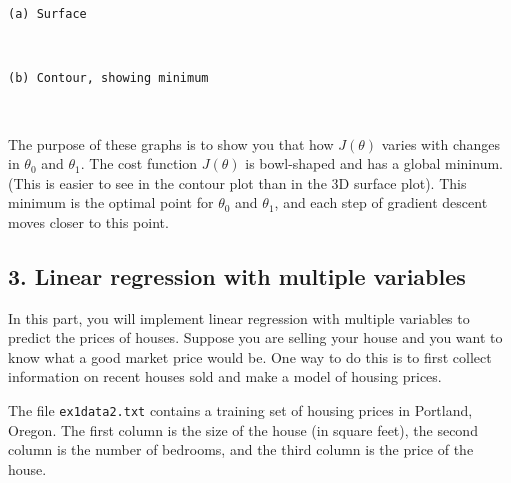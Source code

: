 \documentclass[11pt]{article}
\begin{document}
    \begin{Verbatim}[commandchars=\\\{\}]
(a) Surface

    \end{Verbatim}

    \begin{center}
    \end{center}
    { \hspace*{\fill} \\}
    
    \begin{Verbatim}[commandchars=\\\{\}]
(b) Contour, showing minimum

    \end{Verbatim}

    \begin{center}
    \end{center}
    { \hspace*{\fill} \\}
    
    The purpose of these graphs is to show you that how \(J(\theta)\) varies
with changes in \(\theta_0\) and \(\theta_1\). The cost function
\(J(\theta)\) is bowl-shaped and has a global mininum. (This is easier
to see in the contour plot than in the 3D surface plot). This minimum is
the optimal point for \(\theta_0\) and \(\theta_1\), and each step of
gradient descent moves closer to this point.

    \subsection{3. Linear regression with multiple
variables}\label{linear-regression-with-multiple-variables}

In this part, you will implement linear regression with multiple
variables to predict the prices of houses. Suppose you are selling your
house and you want to know what a good market price would be. One way to
do this is to first collect information on recent houses sold and make a
model of housing prices.

The file \texttt{ex1data2.txt} contains a training set of housing prices
in Portland, Oregon. The first column is the size of the house (in
square feet), the second column is the number of bedrooms, and the third
column is the price of the house.
\end{document}
